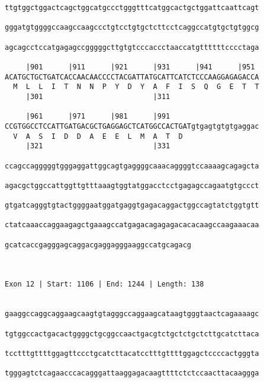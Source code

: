 \documentclass{article}
\begin{document}
\begin{Verbatim}
ttgtggctggactcagctggcatgccctgggtttcatggcactgctggattcaattcagt
                                                            
gggatgtggggccaagccaagccctgtcctgtgctcttcctcaggccatgtgctgtggcg
                                                            
agcagcctccatgagagccgggggcttgtgtcccaccctaaccatgttttttcccctaga
                                                            
     |901      |911      |921      |931      |941      |951 
ACATGCTGCTGATCACCAACAACCCCTACGATTATGCATTCATCTCCCAAGGAGAGACCA
  M  L  L  I  T  N  N  P  Y  D  Y  A  F  I  S  Q  G  E  T  T
     |301                          |311                     
  
     |961      |971      |981      |991                     
CCGTGGCCTCCATTGATGACGCTGAGGAGCTCATGGCCACTGATgtgagtgtgtgaggac
  V  A  S  I  D  D  A  E  E  L  M  A  T  D                  
     |321                          |331                     
  
ccagccagggggtgggaggattggcagtgaggggcaaacaggggtccaaaagcagagcta
                                                            
agacgctggccattggttgtttaaagtggtatggacctcctgagagccagaatgtgccct
                                                            
gtgatcagggtgtactggggaatggatgaggtgagacaggactggccagtatctggtgtt
                                                            
ctatcaaaccaggaagagctgaaagccatgagacagagagacacacaagccaagaaacaa
                                                            
gcatcaccgagggagcaggacgaggagggaaggccatgcagacg
                                            
                                            
 
Exon 12 | Start: 1106 | End: 1244 | Length: 138


gaaggccaggcaggaagcaagtgtagggccaggaagcataagtgggtaactcagaaaagc
                                                            
tgtggccactgacactggggctgcggccaactgacgtctgctctgctcttgcatcttaca
                                                            
tcctttgttttggagttccctgcatcttacatcctttgttttggagctccccactgggta
                                                            
tgggagtctcagaacccacagggattaaggagacaagttttctctccaacttacaaggga
                                                            

\end{Verbatim}
\end{document}
